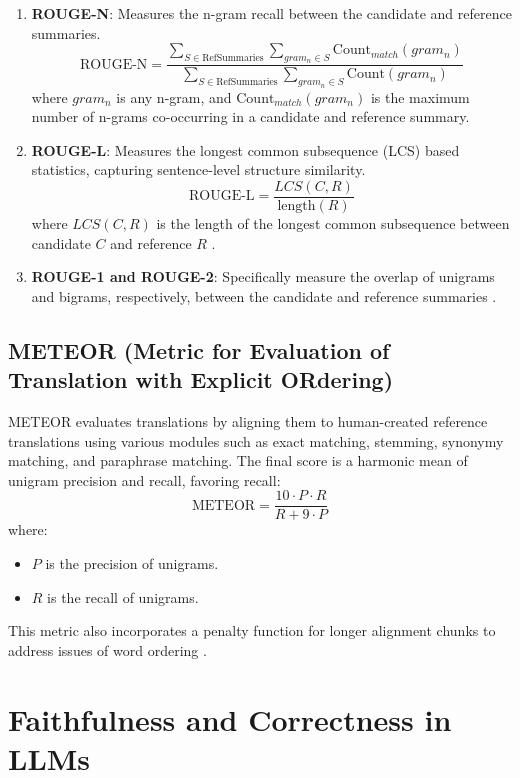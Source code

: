 \begin{enumerate}
    \item \textbf{ROUGE-N}: Measures the n-gram recall between the candidate and reference summaries.
    \[
    \text{ROUGE-N} = \frac{\sum_{S \in \text{RefSummaries}} \sum_{gram_n \in S} \text{Count}_{match}(gram_n)}{\sum_{S \in \text{RefSummaries}} \sum_{gram_n \in S} \text{Count}(gram_n)}
    \]
    where \( gram_n \) is any n-gram, and \( \text{Count}_{match}(gram_n) \) is the maximum number of n-grams co-occurring in a candidate and reference summary.

    \item \textbf{ROUGE-L}: Measures the longest common subsequence (LCS) based statistics, capturing sentence-level structure similarity.
    \[
    \text{ROUGE-L} = \frac{LCS(C, R)}{\text{length}(R)}
    \]
    where \( LCS(C, R) \) is the length of the longest common subsequence between candidate \( C \) and reference \( R \) \cite{Ng2015Better}.

    \item \textbf{ROUGE-1 and ROUGE-2}: Specifically measure the overlap of unigrams and bigrams, respectively, between the candidate and reference summaries \cite{Ganesan2015ROUGE}.
\end{enumerate}

\subsection{METEOR (Metric for Evaluation of Translation with Explicit ORdering)}

METEOR evaluates translations by aligning them to human-created reference translations using various modules such as exact matching, stemming, synonymy matching, and paraphrase matching. The final score is a harmonic mean of unigram precision and recall, favoring recall:
\[
\text{METEOR} = \frac{10 \cdot P \cdot R}{R + 9 \cdot P}
\]
where:
\begin{itemize}
    \item \( P \) is the precision of unigrams.
    \item \( R \) is the recall of unigrams.
\end{itemize}

This metric also incorporates a penalty function for longer alignment chunks to address issues of word ordering \cite{Agarwal2008Meteor}.

\section{Faithfulness and Correctness in LLMs}

